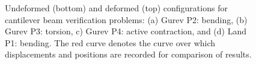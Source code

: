 \begin{figure}[ht]
%
\caption{Undeformed (bottom) and deformed (top) configurations for cantilever beam verification problems: (a) Gurev P2: bending, (b) Gurev P3: torsion, c) Gurev P4: active contraction, and (d) Land P1: bending. The red curve denotes the curve over which displacements and positions are recorded for comparison of results.}
\label{fig:beams}
\end{figure}

